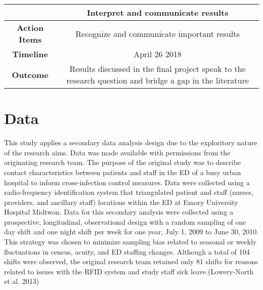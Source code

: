 \documentclass[]{elsarticle} %
\begin{document}
\begin{longtable}[]{@{}cc@{}}
\toprule
\begin{minipage}[b]{0.25\columnwidth}\centering\strut
~\strut
\end{minipage} & \begin{minipage}[b]{0.42\columnwidth}\centering\strut
Interpret and communicate results\strut
\end{minipage}\tabularnewline
\midrule
\endhead
\begin{minipage}[t]{0.25\columnwidth}\centering\strut
\textbf{Action Items}\strut
\end{minipage} & \begin{minipage}[t]{0.42\columnwidth}\centering\strut
Recognize and communicate important results\strut
\end{minipage}\tabularnewline
\begin{minipage}[t]{0.25\columnwidth}\centering\strut
\textbf{Timeline}\strut
\end{minipage} & \begin{minipage}[t]{0.42\columnwidth}\centering\strut
April 26 2018\strut
\end{minipage}\tabularnewline
\begin{minipage}[t]{0.25\columnwidth}\centering\strut
\textbf{Outcome}\strut
\end{minipage} & \begin{minipage}[t]{0.42\columnwidth}\centering\strut
Results discussed in the final project speak to the research question
and bridge a gap in the literature\strut
\end{minipage}\tabularnewline
\bottomrule
\end{longtable}

\section{Data}\label{data}

This study applies a secondary data analysis design due to the
exploritory nature of the research aims. Data was made available with
permissions from the originating research team. The purpose of the
original study was to describe contact characteristics between patients
and staff in the ED of a busy urban hospital to inform cross-infection
control measures. Data were collected using a radio-frequency
identification system that triangulated patient and staff (nurses,
providers, and ancillary staff) locations within the ED at Emory
University Hospital Midtwon. Data for this secondary analysis were
collected using a prospective, longitudinal, observational design with a
random sampling of one day shift and one night shift per week for one
year, July 1, 2009 to June 30, 2010. This strategy was chosen to
minimize sampling bias related to seasonal or weekly fluctuations in
census, acuity, and ED staffing changes. Although a total of 104 shifts
were observed, the original research team retained only 81 shifts for
reasons related to issues with the RFID system and study staff sick
leave.(Lowery-North et al. 2013)
\end{document}
